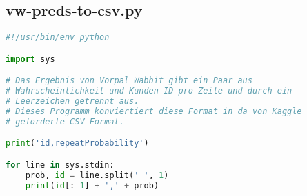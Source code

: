 \subsection{vw-preds-to-csv.py}
\label{code:vw-preds-to-csv}
\begin{lstlisting}[language=Python]
#!/usr/bin/env python

import sys

# Das Ergebnis von Vorpal Wabbit gibt ein Paar aus 
# Wahrscheinlichkeit und Kunden-ID pro Zeile und durch ein
# Leerzeichen getrennt aus.
# Dieses Programm konviertiert diese Format in da von Kaggle
# geforderte CSV-Format.

print('id,repeatProbability')

for line in sys.stdin:
	prob, id = line.split(' ', 1)
	print(id[:-1] + ',' + prob)
\end{lstlisting}
	
	